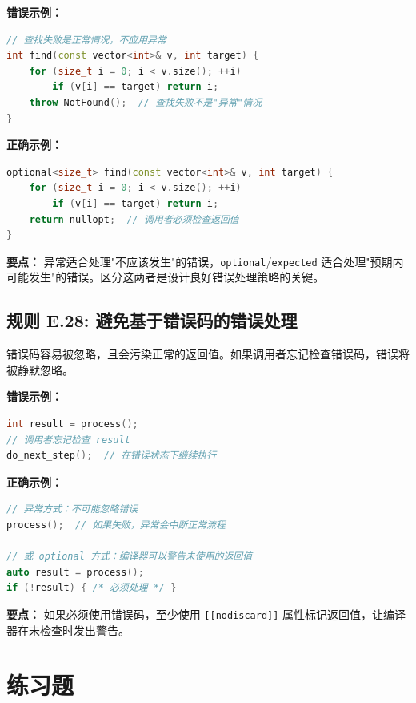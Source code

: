 \textbf{错误示例：}

\begin{lstlisting}[language=C++]
// 查找失败是正常情况，不应用异常
int find(const vector<int>& v, int target) {
    for (size_t i = 0; i < v.size(); ++i)
        if (v[i] == target) return i;
    throw NotFound();  // 查找失败不是"异常"情况
}
\end{lstlisting}

\textbf{正确示例：}

\begin{lstlisting}[language=C++]
optional<size_t> find(const vector<int>& v, int target) {
    for (size_t i = 0; i < v.size(); ++i)
        if (v[i] == target) return i;
    return nullopt;  // 调用者必须检查返回值
}
\end{lstlisting}

\textbf{要点：} 异常适合处理"不应该发生"的错误，\texttt{optional}/\allowbreak{}\texttt{expected} 适合处理"预期内可能发生"的错误。区分这两者是设计良好错误处理策略的关键。

\subsection*{\textbf{规则 E.28:} 避免基于错误码的错误处理}

错误码容易被忽略，且会污染正常的返回值。如果调用者忘记检查错误码，错误将被静默忽略。

\textbf{错误示例：}

\begin{lstlisting}[language=C++]
int result = process();
// 调用者忘记检查 result
do_next_step();  // 在错误状态下继续执行
\end{lstlisting}

\textbf{正确示例：}

\begin{lstlisting}[language=C++]
// 异常方式：不可能忽略错误
process();  // 如果失败，异常会中断正常流程

// 或 optional 方式：编译器可以警告未使用的返回值
auto result = process();
if (!result) { /* 必须处理 */ }
\end{lstlisting}

\textbf{要点：} 如果必须使用错误码，至少使用 \texttt{[[nodiscard]]} 属性标记返回值，让编译器在未检查时发出警告。

\section*{练习题}

